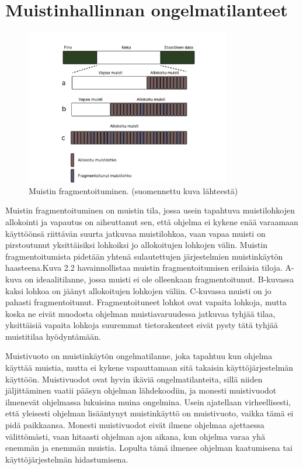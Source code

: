 \section{Muistinhallinnan ongelmatilanteet}

\begin{figure}[tbh]
{\begin{centering}
\includegraphics[width=0.8\textwidth]{kuvat/fragmentaatio.pdf}
\par\end{centering}}
\caption{Muistin fragmentoituminen.\cite{ammsfmes@2016} (suomennettu kuva lähteestä)}
\end{figure}

Muistin fragmentoituminen on muistin tila, jossa usein tapahtuva muistilohkojen allokointi ja vapautus on aiheuttanut sen, että ohjelma ei kykene enää varaamaan käyttöönsä riittävän suurta jatkuvaa muistilohkoa, vaan vapaa muisti on pirstoutunut yksittäisiksi lohkoiksi jo allokoitujen lohkojen välin. Muistin fragmentoitumista pidetään yhtenä sulautettujen järjestelmien muistinkäytön haasteena.\cite{ammsfmes@2016}Kuva 2.2 havainnollistaa muistin fragmentoitumisen erilaisia tiloja. A-kuva on ideaalitilanne, jossa muisti ei ole olleenkaan fragmentoitunut. B-kuvassa kaksi lohkoa on jäänyt allokoitujen lohkojen väliin. C-kuvassa muisti on jo pahasti fragmentoitunut. Fragmentoituneet lohkot ovat vapaita lohkoja, mutta koska ne eivät muodosta ohjelman muistiavaruudessa jatkuvaa tyhjää tilaa, yksittäisiä vapaita lohkoja suuremmat tietorakenteet eivät pysty tätä tyhjää muistitilaa hyödyntämään.

Muistivuoto on muistinkäytön ongelmatilanne, joka tapahtuu kun ohjelma käyttää muistia, mutta ei kykene vapauttamaan sitä takaisin käyttöjärjestelmän käyttöön. Muistivuodot ovat hyvin ikäviä ongelmatilanteita, sillä niiden jäljittäminen vaatii pääsyn ohjelman lähdekoodiin, ja monesti muistivuodot ilmenevät ohjelmassa lukuisina muina ongelmina. Usein ajatellaan virheellisesti, että yleisesti ohjelman lisääntynyt muistinkäyttö on muistivuoto, vaikka tämä ei pidä paikkaansa. Monesti muistivuodot eivät ilmene ohjelmaa ajettaessa välittömästi, vaan hitaasti ohjelman ajon aikana, kun ohjelma varaa yhä enemmän ja enemmän muistia. Lopulta tämä ilmenee ohjelman kaatumisena tai käyttöjärjestelmän hidastumisena.\cite{mmic2010}

